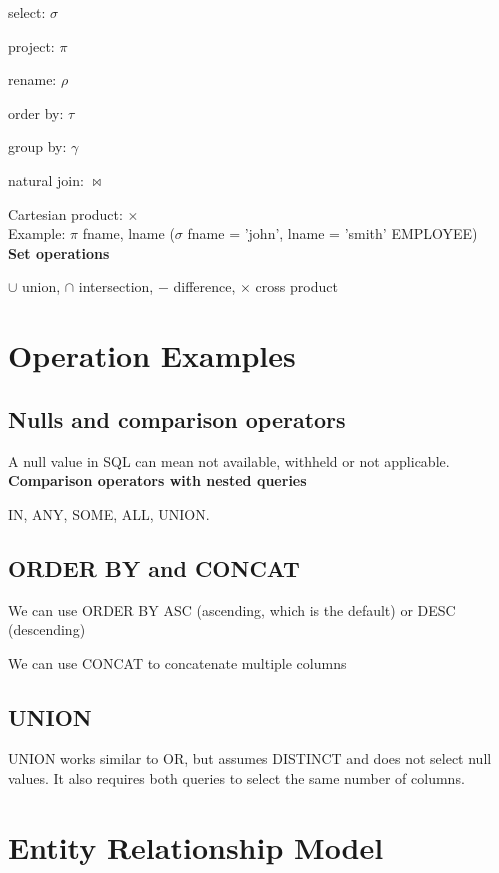 \documentclass[english,openany]{book}
\begin{document}
    select: $\sigma$

    project: $\pi$

    rename: $\rho$

    order by: $\tau$

    group by: $\gamma$

    natural join: $\bowtie$

    Cartesian product: $\times$\\

    Example: $\pi$ fname, lname ($\sigma$ fname = 'john', lname = 'smith' EMPLOYEE)\\

    \textbf{Set operations}

    $\cup$ union, $\cap$ intersection, $-$ difference, $\times$ cross product

    \chapter{Operation Examples}

    \section{Nulls and comparison operators}

    A null value in SQL can mean not available, withheld or not applicable.\\

    \textbf{Comparison operators with nested queries}

    IN, ANY, SOME, ALL, UNION.

   \section{ORDER BY and CONCAT}

    We can use ORDER BY  ASC (ascending, which is the default) or DESC (descending)

    We can use CONCAT to concatenate multiple columns

    \section{UNION}

    UNION works similar to OR, but assumes DISTINCT and does not select null values. It also requires both queries to select the same number of columns.

    \chapter{Entity Relationship Model}
\end{document}
